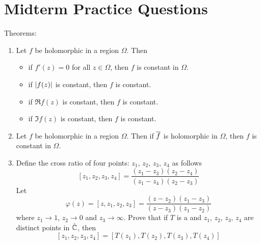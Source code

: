 \documentclass[12pt]{article}
\begin{document}
\section{Midterm Practice Questions} 
Theorems: \begin{enumerate} 
\item Let $f$ be holomorphic in a region $\Omega$. Then \begin{itemize}
\item if $f'(z) = 0$ for all $z \in \Omega$, then $f$ is constant in $\Omega$.
\item if $\abs{f(z)}$ is constant, then $f$ is constant.
\item if $\Re{f(z)}$ is constant, then $f$ is constant. 
\item if $\Im{f(z)}$ is constant, then $f$ is constant. \end{itemize} 
\item Let $f$ be holomorphic in a region $\Omega$. Then if $\overline{f}$ is holomorphic in $\Omega$, then $f$ is constant in $\Omega$. 
\item Define the cross ratio of four points: $z_1$, $z_2$, $z_3$, $z_4$ as follows 
$$[z_1,z_2,z_3,z_4] = \frac{(z_1-z_3)(z_2-z_4)}{(z_1 - z_4)(z_2-z_3)}$$ Let $$ \varphi(z) = [z,z_1,z_2,z_3] = \frac{(z-z_2)(z_1-z_3)}{(z-z_3)(z_1-z_2)}$$ where $z_1 \to 1$, $z_2 \to 0$ and $z_3 \to \infty$. Prove that if $T$ is a \mobt and $z_1$, $z_2$, $z_3$, $z_4$ are distinct points in $\hat{\mathbb{C}}$, then $$ [z_1,z_2,z_3,z_4] = [T(z_1),T(z_2),T(z_3),T(z_4)]$$ 
\end{enumerate} 
\end{document}

